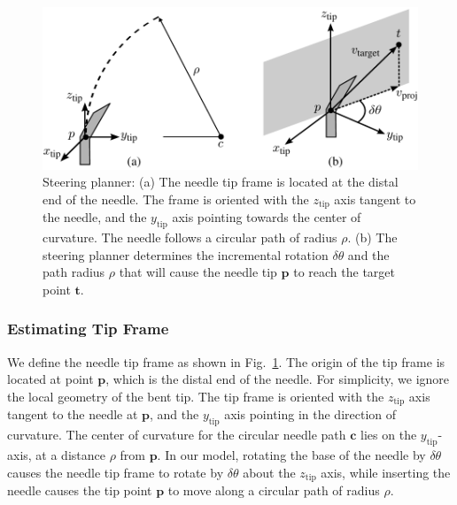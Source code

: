 \begin{figure}[!t]
\centering
\includegraphics[width = 0.75\columnwidth]{Images/Chapter2/ControlAlgorithm/ControlAlgorithm}%
\caption[Steering planner]{Steering planner: (a) The needle tip frame is located at the distal end of the needle. The frame is oriented with the $z_{\text{tip}}$ axis tangent to the needle, and the $y_{\text{tip}}$ axis pointing towards the center of curvature. The needle follows a circular path of radius $\rho$. (b) The steering planner determines the incremental rotation $\delta\theta$ and the path radius $\rho$ that will cause the needle tip $\bm{p}$ to reach the target point $\bm{t}$.  }
\label{fig:ControlAlgorithm}
\end{figure}

\subsubsection{Estimating Tip Frame}
We define the needle tip frame as shown in Fig.~\ref{fig:ControlAlgorithm}. The origin of the tip frame is located at point $\bm{p}$, which is the distal end of the needle. For simplicity, we ignore the local geometry of the bent tip. The tip frame is oriented with the $z_{\text{tip}}$ axis tangent to the needle at $\bm{p}$, and the $y_{\text{tip}}$ axis pointing in the direction of curvature. The center of curvature for the circular needle path $\bm{c}$ lies on the $y_{\text{tip}}$-axis, at a distance $\rho$ from $\bm{p}$. In our model, rotating the base of the needle by $\delta\theta$ causes the needle tip frame to rotate by $\delta\theta$ about the $z_{\text{tip}}$ axis, while inserting the needle causes the tip point $\bm{p}$ to move along  a circular path of radius $\rho$.

